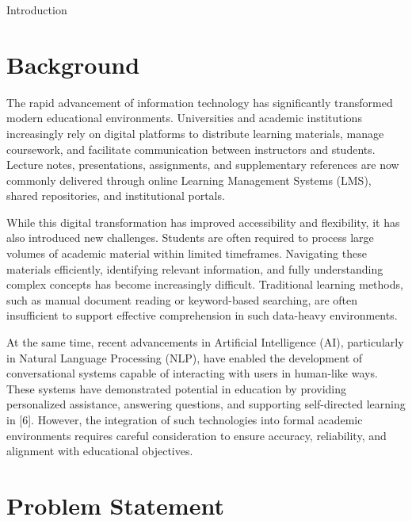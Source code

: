 \documentclass[12pt, a4paper, oneside]{report}
\makeatletter
\newcommand{\chapformat}[1]{%
  \centering
  {\fontsize{14}{17}\selectfont\itshape\addfontfeatures{LetterSpace=3.5}%
    \MakeUppercase{\chaptertitlename}\ \thechapter}\\[24pt]%
  {\fontsize{16}{19}\selectfont\bfseries\addfontfeatures{LetterSpace=0}%
    \MakeUppercase{#1}}%
}
\newcommand{\chapformatstar}[1]{%
  \centering
  {\fontsize{16}{19}\selectfont\bfseries\MakeUppercase{#1}}%
}
\newcommand{\chapterstar}[1]{%
  \clearpage
  \phantomsection
  \edef\@saved@chapcount{\the\value{chapter}}%
  \titleformat{\chapter}[block]{}{}%
    {0pt}{\chapformatstar}%
  \@originalchapter*{#1}%
  \setcounter{chapter}{\@saved@chapcount}%
  \titleformat{\chapter}[block]{}{}%
    {0pt}{\chapformat}%
}
\let\@originalchapter\chapter
\renewcommand{\chapter}{%
  \@ifstar{\chapterstar}{\@originalchapter}%
}
\let\oldsection\section
\renewcommand{\section}{%
  \addtocontents{toc}{\protect\needspace{4\baselineskip}}%
  \oldsection
}
\makeatother
\begin{document}
\clearpage

\chapter{Introduction}

\section{Background}

The rapid advancement of information technology has significantly transformed modern educational environments. Universities and academic institutions increasingly rely on digital platforms to distribute learning materials, manage coursework, and facilitate communication between instructors and students. Lecture notes, presentations, assignments, and supplementary references are now commonly delivered through online Learning Management Systems (LMS), shared repositories, and institutional portals.

While this digital transformation has improved accessibility and flexibility, it has also introduced new challenges. Students are often required to process large volumes of academic material within limited timeframes. Navigating these materials efficiently, identifying relevant information, and fully understanding complex concepts has become increasingly difficult. Traditional learning methods, such as manual document reading or keyword-based searching, are often insufficient to support effective comprehension in such data-heavy environments.

At the same time, recent advancements in Artificial Intelligence (AI), particularly in Natural Language Processing (NLP), have enabled the development of conversational systems capable of interacting with users in human-like ways. These systems have demonstrated potential in education by providing personalized assistance, answering questions, and supporting self-directed learning in [6]. However, the integration of such technologies into formal academic environments requires careful consideration to ensure accuracy, reliability, and alignment with educational objectives.

\newpage

\section{Problem Statement}
\end{document}
